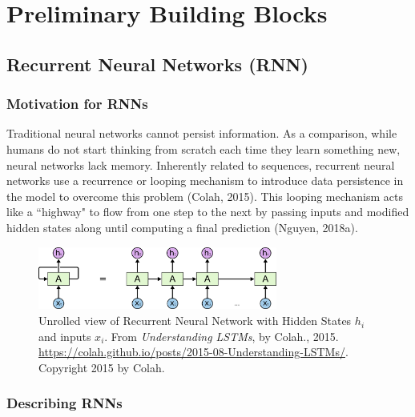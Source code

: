 \section{Preliminary Building Blocks}

\subsection{Recurrent Neural Networks (RNN)}

\subsubsection{Motivation for RNNs}

Traditional neural networks cannot persist information. As a comparison, while humans do not start thinking from scratch each time they learn something new, neural networks lack memory. Inherently related to sequences, recurrent neural networks use a recurrence or looping mechanism to introduce data persistence in the model to overcome this problem (Colah, 2015). This looping mechanism acts like a ``highway" to flow from one step to the next by passing inputs and modified hidden states along until computing a final prediction (Nguyen, 2018a). 

\begin{figure}[h]
\centering
\includegraphics[width=0.7\textwidth]{imgs/rnn_colah_unrolled.png}
\caption{Unrolled view of Recurrent Neural Network with Hidden States $h_i$ and inputs $x_i$. From \emph{Understanding LSTMs}, by Colah., 2015. \url{https://colah.github.io/posts/2015-08-Understanding-LSTMs/}. Copyright 2015 by Colah.}
\end{figure}


\subsubsection{Describing RNNs}


